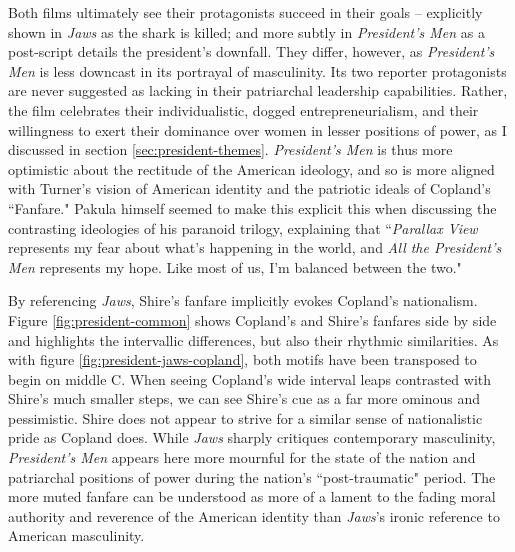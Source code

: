 Both films ultimately see their protagonists succeed in their goals – explicitly shown in \textit{Jaws} as the shark is killed; and more subtly in \textit{President's Men} as a post-script details the president's downfall.
They differ, however, as \textit{President's Men} is less downcast in its portrayal of masculinity.
Its two reporter protagonists are never suggested as lacking in their patriarchal leadership capabilities.
Rather, the film celebrates their individualistic, dogged entrepreneurialism, and their willingness to exert their dominance over women in lesser positions of power, as I discussed in section  \ref{sec:president-themes}.
\textit{President's Men} is thus more optimistic about the rectitude of the American ideology, and so is more aligned with Turner's vision of American identity and the patriotic ideals of Copland's ``Fanfare."
Pakula himself seemed to make this explicit this when discussing the contrasting ideologies of his paranoid trilogy, explaining that ``\textit{Parallax View} represents my fear about what's happening in the world, and \textit{All the President's Men} represents my hope. Like most of us, I'm balanced between the two."\autocites[Pakula, quoted in][]{aquilina_all_2021}


By referencing \textit{Jaws}, Shire's fanfare implicitly evokes Copland's nationalism.\autocites[Although Copland's influence on Shire's compositional practices has been less documented than Williams', Juan Chattah notes that he was exposed to Copland's work from a young age and this ``had a profound effect on Shire, and triggered his interest in contemporary concert music."][2]{chattah_david_2015}
Figure \ref{fig:president-common} shows Copland's and Shire's fanfares side by side and highlights the intervallic differences, but also their rhythmic similarities.
As with figure \ref{fig:president-jaws-copland}, both motifs have been transposed to begin on middle C.
When seeing Copland's wide interval leaps contrasted with Shire's much smaller steps, we can see Shire's cue as a far more ominous and pessimistic.
Shire does not appear to strive for a similar sense of nationalistic pride as Copland does.
While \textit{Jaws} sharply critiques contemporary masculinity, \textit{President's Men} appears here more mournful for the state of the nation and patriarchal positions of power during the nation's ``post-traumatic" period.\autocites[][]{keathley_trapped_2004}
The more muted fanfare can be understood as more of a lament to the fading moral authority and reverence of the American identity than \textit{Jaws}'s ironic reference to American masculinity.

